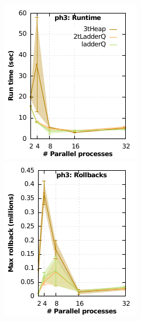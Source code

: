 \begin{figure}
\begin{minipage}{0.32\linewidth}
\begin{minipage}{0.49\linewidth}
\includegraphics[width=\linewidth]{images/ph3_Delay_1_Evt_2_run_time}
\end{minipage}
\begin{minipage}{0.49\linewidth}
\includegraphics[width=\linewidth]{images/ph3_Delay_1_Evt_2_rollbacks}

\end{minipage}
\end{minipage}
\end{figure}
